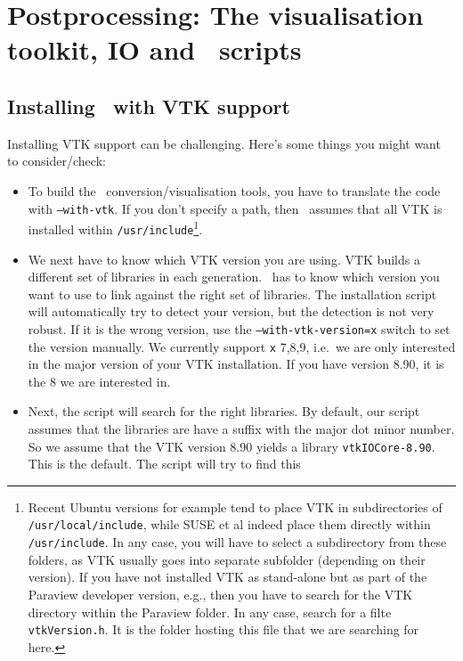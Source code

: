 \chapter{Postprocessing: The visualisation toolkit, IO and \Peano\
scripts}
\label{chapter:postprocessing}

\section{Installing \Peano\ with VTK support}
Installing VTK support can be challenging. 
Here's some things you might want to consider/check:

\begin{itemize}
  \item To build the \Peano\ conversion/visualisation tools, you have to
  translate the code with \texttt{--with-vtk}. If you don't
  specify a path, then \Peano\ assumes that all VTK is installed 
  within \texttt{/usr/include}\footnote{Recent Ubuntu
  versions for example tend to place VTK in subdirectories of
  \texttt{/usr/local/include}, while SUSE et al indeed place them directly
  within \texttt{/usr/include}. In any case, you will have to select a
  subdirectory from these folders, as VTK usually goes into separate subfolder (depending on their
  version). If you have not installed VTK as stand-alone but as part of the
  Paraview developer version, e.g., then you have to search for the VTK
  directory within the Paraview folder. In any case, search for a
  filte \texttt{vtkVersion.h}. It is the folder hosting this file that we are
  searching for here.}.
  \item We next have to know which VTK version you are using. VTK builds a
  different set of libraries in each generation. \Peano\ has to know which
  version you want to use to link against the right set of libraries. The
  installation script will automatically try to detect your version, but the
  detection is not very robust. If it is the wrong version, use the
  \texttt{--with-vtk-version=x} switch to set the version manually. We currently
  support \texttt{x} 7,8,9, i.e.~we are only interested in the major version of
  your VTK installation. If you have version 8.90, it is the 8 we are interested
  in.
  \item Next, the script will search for the right libraries. By default, our
  script assumes that the libraries are have a suffix with the major dot minor
  number. So we assume that the VTK version 8.90 yields a library
  \texttt{vtkIOCore-8.90}. This is the default. The script will try to find this

\end{itemize}
